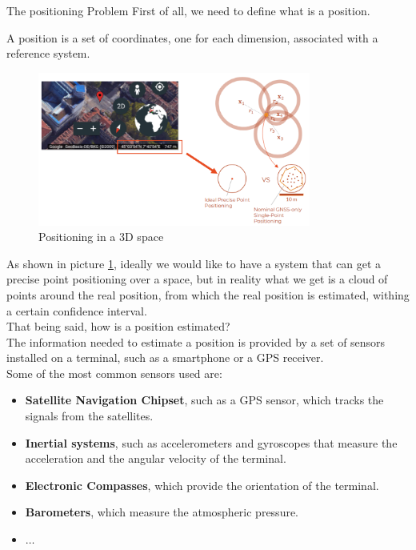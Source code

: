   \begin{section}{The positioning Problem}
    First of all, we need to define what is a position.\\
    \begin{boxH}
      A position is a set of coordinates, one for each dimension, associated with a reference 
      system.
    \end{boxH}
    \begin{figure}[h]
      \centering
      \includegraphics[width=0.8\textwidth]{img/wireless/GNSS position.png}
      \caption{Positioning in a 3D space}
      \label{fig:GNSS position}
    \end{figure}
    As shown in picture \ref{fig:GNSS position}, ideally we would like to have a system that can
    get a precise point positioning over a space, but in reality what we get is a cloud of points
    around the real position, from which the real position is estimated, withing a certain confidence
    interval.\\

    That being said, how is a position estimated?\\
    The information needed to estimate a position is provided by a set of sensors installed on 
    a terminal, such as a smartphone or a GPS receiver.\\
    Some of the most common sensors used are:
    \begin{itemize}
      \item \textbf{Satellite Navigation Chipset}, such as a GPS sensor, which tracks the signals
        from the satellites.
      \item \textbf{Inertial systems}, such as accelerometers and gyroscopes that measure the 
        acceleration and the angular velocity of the terminal.
      \item \textbf{Electronic Compasses}, which provide the orientation of the terminal.
      \item \textbf{Barometers}, which measure the atmospheric pressure.
      \item $\dots$
    \end{itemize}


\end{section}

